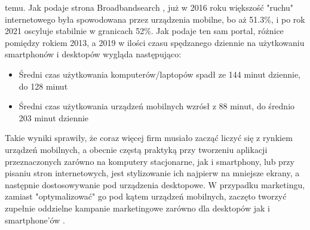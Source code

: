 \documentclass[12pt, a4paper]{article}
\begin{document}
\begin{sloppypar}
{{    temu. Jak podaje strona Broadbandsearch \cite{dvm}, już w 2016 roku większość "ruchu"
    internetowego była spowodowana przez urządzenia mobilne, bo aż 51.3\%, i po 
    rok 2021 oscyluje stabilnie w granicach 52\%. Jak podaje ten sam portal,
    różnice pomiędzy rokiem 2013, a 2019 w ilości czasu spędzanego dziennie na 
    użytkowaniu smartphonów i desktopów wygląda następująco:
    \begin{itemize}
      \item Średni czas użytkowania komputerów/laptopów spadł ze 144 minut dziennie, do 128 minut
      \item Średni czas użytkowania urządzeń mobilnych wzrósł z 88 minut, do średnio 203 minut dziennie 
    \end{itemize} 
    Takie wyniki sprawiły, że coraz więcej firm musiało zacząć liczyć się z 
    rynkiem urządzeń mobilnych, a obecnie częstą praktyką przy tworzeniu aplikacji 
    przeznaczonych zarówno na komputery stacjonarne, jak i smartphony, lub przy 
    pisaniu stron internetowych, jest stylizowanie ich najpierw na mniejsze ekrany,
    a następnie dostosowywanie pod urządzenia desktopowe. W przypadku marketingu, 
    zamiast "optymalizować" go pod kątem urządzeń mobilnych, zaczęto tworzyć zupełnie
    oddzielne kampanie marketingowe zarówno dla desktopów jak i smartphone'ów
    \cite{mobile_strategy}.
  }
}
\end{sloppypar}
\end{document}
